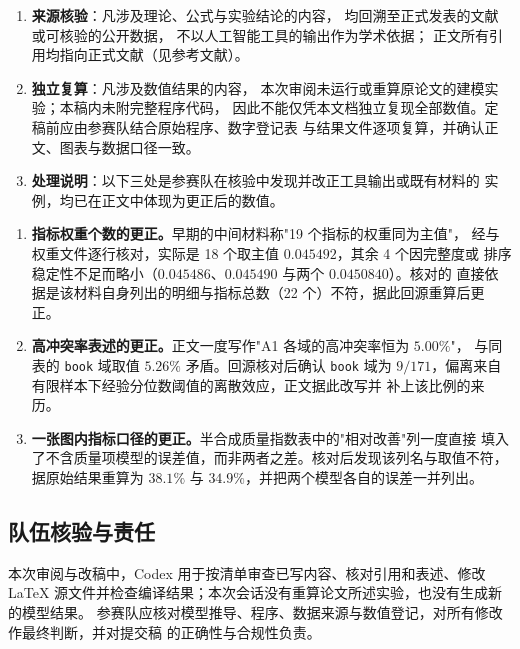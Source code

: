\documentclass[bwprint]{gmcmthesis}
\numberwithin{equation}{section}
\numberwithin{figure}{section}
\numberwithin{table}{section}
\begin{document}
\begin{appendices}
\begin{enumerate}
  \item \textbf{来源核验}：凡涉及理论、公式与实验结论的内容，
        均回溯至正式发表的文献或可核验的公开数据，
        不以人工智能工具的输出作为学术依据；
        正文所有引用均指向正式文献（见参考文献）。
  \item \textbf{独立复算}：凡涉及数值结果的内容，
        本次审阅未运行或重算原论文的建模实验；本稿内未附完整程序代码，
        因此不能仅凭本文档独立复现全部数值。定稿前应由参赛队结合原始程序、数字登记表
        与结果文件逐项复算，并确认正文、图表与数据口径一致。
  \item \textbf{处理说明}：以下三处是参赛队在核验中发现并改正工具输出或既有材料的
        实例，均已在正文中体现为更正后的数值。
\end{enumerate}

\begin{enumerate}
  \item \textbf{指标权重个数的更正。}早期的中间材料称"19 个指标的权重同为主值"，
        经与权重文件逐行核对，实际是 18 个取主值 $0.045492$，其余 4 个因完整度或
        排序稳定性不足而略小（$0.045486$、$0.045490$ 与两个 $0.0450840$）。核对的
        直接依据是该材料自身列出的明细与指标总数（22 个）不符，据此回源重算后更正。
  \item \textbf{高冲突率表述的更正。}正文一度写作"A1 各域的高冲突率恒为 $5.00\%$"，
        与同表的 \texttt{book} 域取值 $5.26\%$ 矛盾。回源核对后确认 \texttt{book}
        域为 $9/171$，偏离来自有限样本下经验分位数阈值的离散效应，正文据此改写并
        补上该比例的来历。
  \item \textbf{一张图内指标口径的更正。}半合成质量指数表中的"相对改善"列一度直接
        填入了不含质量项模型的误差值，而非两者之差。核对后发现该列名与取值不符，
        据原始结果重算为 $38.1\%$ 与 $34.9\%$，并把两个模型各自的误差一并列出。
\end{enumerate}


\subsection{队伍核验与责任}

本次审阅与改稿中，Codex 用于按清单审查已写内容、核对引用和表述、修改 LaTeX
源文件并检查编译结果；本次会话没有重算论文所述实验，也没有生成新的模型结果。
参赛队应核对模型推导、程序、数据来源与数值登记，对所有修改作最终判断，并对提交稿
的正确性与合规性负责。

\end{appendices}
\end{document}
